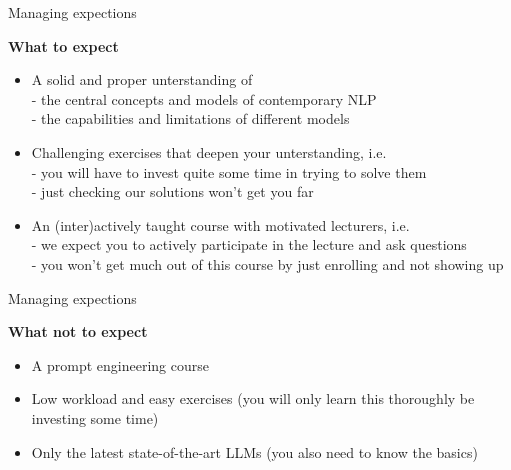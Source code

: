 \begin{vbframe}{Managing expections}

\vfill

\textbf{What to expect}

	\begin{itemize}
		\item A solid and proper unterstanding of\\
		- the central concepts and models of contemporary NLP\\
		- the capabilities and limitations of different models
		\item Challenging exercises that deepen your unterstanding, i.e.\\
		- you will have to invest quite some time in trying to solve them\\
		- just checking our solutions won't get you far
		\item An (inter)actively taught course with motivated lecturers, i.e.\\
		- we expect you to actively participate in the lecture and ask questions\\
		- you won't get much out of this course by just enrolling and not showing up
	\end{itemize}


\vfill

\end{vbframe}


\begin{vbframe}{Managing expections}

\vfill

\textbf{What not to expect}

	\begin{itemize}
		\item A prompt engineering course
		\item Low workload and easy exercises (you will only learn this thoroughly be investing some time)
		\item Only the latest state-of-the-art LLMs (you also need to know the basics)
	\end{itemize}

\vfill

\end{vbframe}



